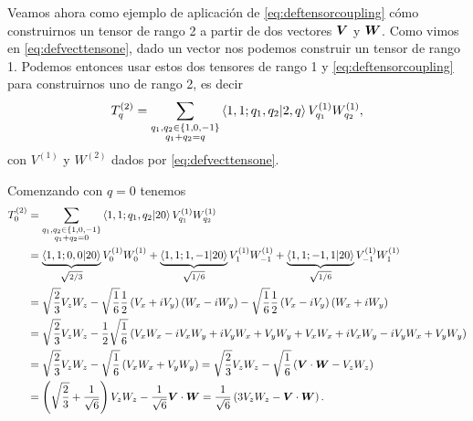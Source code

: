 \documentclass[10pt, a4paper]{article}
\numberwithin{equation}{subsection}
\begin{document}
Veamos ahora como ejemplo de aplicación de \eqref{eq:deftensorcoupling} cómo
construirnos un tensor de rango 2 a partir de dos vectores $\vb*{V}$ y
$\vb*{W}$. Como vimos en \eqref{eq:defvecttensone}, dado un vector nos podemos
construir un tensor de rango 1. Podemos entonces usar estos dos tensores de
rango 1 y \eqref{eq:deftensorcoupling} para construirnos uno de rango 2, es
decir
\begin{equation}
  T^{(2)}_q = \sum_{\substack{q_1,q_2\in\set{1,0,-1} \\ q_1 + q_2 = q}}
    \braket{1,1;q_1,q_2}{2,q} V^{(1)}_{q_1} W^{(1)}_{q_2},
\end{equation}
con $V^{(1)}$ y $W^{(2)}$ dados por \eqref{eq:defvecttensone}.

Comenzando con $q = 0$ tenemos
\begin{align}
  T^{(2)}_0 &= \sum_{\substack{q_1,q_2\in\set{1,0,-1} \\ q_1 + q_2 = 0}}
    \braket{1,1;q_1,q_2}{20} V^{(1)}_{q_1} W^{(1)}_{q_2} \nonumber \\
  &= \underbrace{\braket{1,1;0,0}{20}}_{\sqrt{2/3}} V^{(1)}_{0} W^{(1)}_{0} +
    \underbrace{\braket{1,1;1,-1}{20}}_{\sqrt{1/6}} V^{(1)}_{1} W^{(1)}_{-1} +
    \underbrace{\braket{1,1;-1,1}{20}}_{\sqrt{1/6}} V^{(1)}_{-1} W^{(1)}_{1}
    \nonumber \\
  &= \sqrt{\frac{2}{3}} V_z W_z
    -\sqrt{\frac{1}{6}}\frac{1}{2}\left(V_x+iV_y\right)\left(W_x-iW_y\right)
    -\sqrt{\frac{1}{6}}\frac{1}{2}\left(V_x-iV_y\right)\left(W_x+iW_y\right)
    \nonumber \\
  &= \sqrt{\frac{2}{3}} V_z W_z
    -\frac{1}{2}\sqrt{\frac{1}{6}}\left(V_xW_x -iV_xW_y +iV_yW_x + V_yW_y
    +V_xW_x + iV_xW_y - iV_yW_x + V_yW_y\right) \nonumber \\
  &= \sqrt{\frac{2}{3}} V_z W_z
    -\sqrt{\frac{1}{6}}\left(V_xW_x + V_yW_y\right) 
    = \sqrt{\frac{2}{3}} V_z W_z -\sqrt{\frac{1}{6}}\left(\vect{V}\cdot\vect{W}
    -V_zW_z\right) \nonumber \\
  &= \left(\sqrt{\frac{2}{3}} + \frac{1}{\sqrt{6}}\right) V_z W_z
    -\frac{1}{\sqrt{6}}\vect{V}\cdot\vect{W}
    = \frac{1}{\sqrt{6}}\left(3V_z W_z - \vect{V}\cdot\vect{W}\right).
\end{align}
\end{document}
